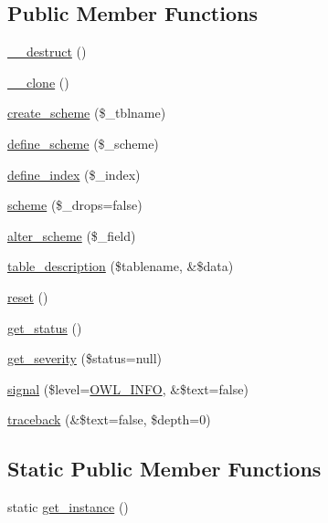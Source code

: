 \subsection*{Public Member Functions}
\begin{DoxyCompactItemize}
\item 
\hyperlink{classSchemeHandler_a3d786efe6ef92858de21438b59774226}{\_\-\_\-destruct} ()
\item 
\hyperlink{classSchemeHandler_af0a48894ea6bb36f3149ccd40bf37681}{\_\-\_\-clone} ()
\item 
\hyperlink{classSchemeHandler_ae00497936108b220b41af512774cfc16}{create\_\-scheme} (\$\_\-tblname)
\item 
\hyperlink{classSchemeHandler_a07f6b7c5ac78e88f32584b90da53776b}{define\_\-scheme} (\$\_\-scheme)
\item 
\hyperlink{classSchemeHandler_a92adefff835050da61337524b9ae907b}{define\_\-index} (\$\_\-index)
\item 
\hyperlink{classSchemeHandler_a1e843dc411d175818c7b2ab5374f021e}{scheme} (\$\_\-drops=false)
\item 
\hyperlink{classSchemeHandler_aa8948e6382f7d19302a255ff0619765c}{alter\_\-scheme} (\$\_\-field)
\item 
\hyperlink{classSchemeHandler_a236edc61301c6926449e68385cc59a99}{table\_\-description} (\$tablename, \&\$data)
\item 
\hyperlink{classSchemeHandler_aa25feb4a70d67b3d571904be4b2f50bc}{reset} ()
\item 
\hyperlink{class__OWL_a99ec771fa2c5c279f80152cc09e489a8}{get\_\-status} ()
\item 
\hyperlink{class__OWL_adf9509ef96858be7bdd9414c5ef129aa}{get\_\-severity} (\$status=null)
\item 
\hyperlink{class__OWL_a51ba4a16409acf2a2f61f286939091a5}{signal} (\$level=\hyperlink{owl_8severitycodes_8php_a139328861128689f2f4def6a399d9057}{OWL\_\-INFO}, \&\$text=false)
\item 
\hyperlink{class__OWL_aa29547995d6741b7d2b90c1d4ea99a13}{traceback} (\&\$text=false, \$depth=0)
\end{DoxyCompactItemize}
\subsection*{Static Public Member Functions}
\begin{DoxyCompactItemize}
\item 
static \hyperlink{classSchemeHandler_a02edff8af08e3e33a7571e2da8f98cc7}{get\_\-instance} ()
\end{DoxyCompactItemize}
